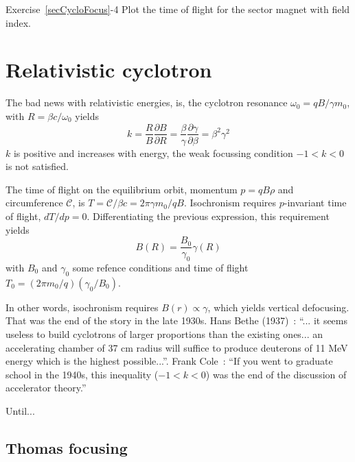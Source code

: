 \smallskip
\noindent {\small $\bullet$} Exercise~\ref{secCycloFocus}-4
Plot the time of flight for  the sector magnet with field index. 





\section{Relativistic cyclotron \label{secCycloRel}}

The bad news with relativistic energies, is, 
the cyclotron resonance $\omega_0 = qB/\gamma m_0$, with $R = \beta c / \omega_0$  yields  
\begin{equation}
\label{EqCycloReson}
  k = \frac{R}{B}\frac{\partial B}{\partial R} = \frac{\beta}{\gamma} 
  \frac{\partial \gamma}{\partial \beta} = \beta^2 \gamma^2 
\end{equation}
$k$ is positive and increases with energy, 
 the weak focussing condition $-1<k<0$ is not satisfied. 

The time of flight on the equilibrium orbit, momentum $p = qB\rho$ and circumference $\mathcal{C}$, is 
$T =  \mathcal{C}/ \beta c = 2\pi \gamma m_0 / qB$. 
    Isochronism requires $p$-invariant time of flight, $dT/dp=0$. Differentiating the previous expression,
this requirement yields 
\begin{equation}
\label{EqCycloBgamma}
B(R) = \frac{B_0}{\gamma_0} \gamma(R)
\end{equation}
with $B_0$ and $\gamma_0$  some refence conditions and time of flight $T_0 = (2\pi m_0/q)(\gamma_0/B_0)$.

In other words, isochronism requires $ B(r) \propto \gamma$, which yields vertical defocusing. 
That was the end of the story in the late 1930s. 
Hans Bethe (1937)~: 
``... it seems useless to build cyclotrons of larger proportions than the  
existing ones... an accelerating chamber of 37 cm radius will  suffice to 
produce deuterons of 11 MeV energy which is the highest possible...''. 
Frank Cole~: ``If you went to graduate school in the 1940s, this inequality ($−1 <
k < 0$) was the end of the discussion of accelerator theory.''

  Until...

\subsection{Thomas focusing}


